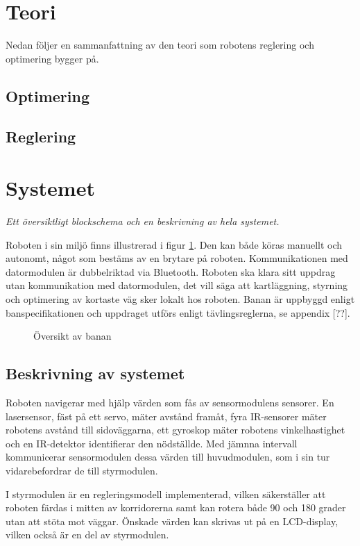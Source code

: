 \documentclass[11pt]{article}
\begin{document}
\begin{flushleft}
\pagebreak


\section{Teori}
Nedan följer en sammanfattning av den teori som robotens reglering och optimering bygger på.

\subsection{Optimering}


\subsection{Reglering}
\label{subsection:reglering}
\section{Systemet}
\textit{Ett översiktligt blockschema och en beskrivning av hela systemet.}

Roboten i sin miljö finns illustrerad i figur \ref{system}. Den kan både köras manuellt och autonomt, något som bestäms av en brytare på roboten. Kommunikationen med datormodulen är dubbelriktad via Bluetooth\textsuperscript{\circledR}. Roboten ska klara sitt uppdrag utan kommunikation med datormodulen, det vill säga att kartläggning, styrning och optimering av kortaste väg sker lokalt hos roboten. Banan är uppbyggd enligt banspecifikationen och uppdraget utförs enligt tävlingsreglerna, se appendix [??].

\begin{figure}[htbp]
\centering
\noindent\resizebox{.8\linewidth}{!}{
	}
	\caption{Översikt av banan\label{system}}	
\end{figure}

\subsection{Beskrivning av systemet}
Roboten navigerar med hjälp värden som fås av sensormodulens sensorer. En lasersensor, fäst på ett servo, mäter avstånd framåt, fyra IR-sensorer mäter robotens avstånd till sidoväggarna, ett gyroskop mäter robotens vinkelhastighet och en IR-detektor identifierar den nödställde. Med jämnna intervall kommunicerar sensormodulen dessa värden till huvudmodulen, som i sin tur vidarebefordrar de till styrmodulen. 

I styrmodulen är en regleringsmodell implementerad, vilken säkerställer att roboten färdas i mitten av korridorerna samt kan rotera både 90 och 180 grader utan att stöta mot väggar. Önskade värden kan skrivas ut på en LCD-display, vilken också är en del av styrmodulen.


\end{flushleft}
\end{document}
